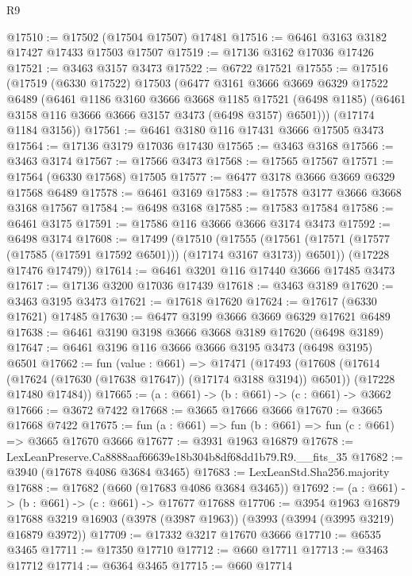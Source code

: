 \begin{lexlean}{R9}
\begin{coremodule}
@17510 := @17502 (@17504 @17507) @17481
@17516 := @6461 @3163 @3182 @17427 @17433 @17503 @17507
@17519 := @17136 @3162 @17036 @17426
@17521 := @3463 @3157 @3473
@17522 := @6722 @17521
@17555 := @17516
    (@17519
      (@6330 @17522)
      @17503
      (@6477
        @3161
        @3666
        @3669
        @6329
        @17522
        @6489
        (@6461
          @1186
          @3160
          @3666
          @3668
          @1185
          @17521
          (@6498 @1185)
          (@6461 @3158 @116 @3666 @3666 @3157 @3473 (@6498 @3157) @6501)))
      (@17174 @1184 @3156))
@17561 := @6461 @3180 @116 @17431 @3666 @17505 @3473
@17564 := @17136 @3179 @17036 @17430
@17565 := @3463 @3168
@17566 := @3463 @3174
@17567 := @17566 @3473
@17568 := @17565 @17567
@17571 := @17564 (@6330 @17568) @17505
@17577 := @6477 @3178 @3666 @3669 @6329 @17568 @6489
@17578 := @6461 @3169
@17583 := @17578 @3177 @3666 @3668 @3168 @17567
@17584 := @6498 @3168
@17585 := @17583 @17584
@17586 := @6461 @3175
@17591 := @17586 @116 @3666 @3666 @3174 @3473
@17592 := @6498 @3174
@17608 := @17499
    (@17510
      (@17555 (@17561 (@17571 (@17577 (@17585 (@17591 @17592 @6501))) (@17174 @3167 @3173)) @6501))
      (@17228 @17476 @17479))
@17614 := @6461 @3201 @116 @17440 @3666 @17485 @3473
@17617 := @17136 @3200 @17036 @17439
@17618 := @3463 @3189
@17620 := @3463 @3195 @3473
@17621 := @17618 @17620
@17624 := @17617 (@6330 @17621) @17485
@17630 := @6477 @3199 @3666 @3669 @6329 @17621 @6489
@17638 := @6461 @3190 @3198 @3666 @3668 @3189 @17620 (@6498 @3189)
@17647 := @6461 @3196 @116 @3666 @3666 @3195 @3473 (@6498 @3195) @6501
@17662 := fun (value : @661) =>
  @17471
    (@17493
      (@17608 (@17614 (@17624 (@17630 (@17638 @17647)) (@17174 @3188 @3194)) @6501))
      (@17228 @17480 @17484))
@17665 := (a : @661) -> (b : @661) -> (c : @661) -> @3662
@17666 := @3672 @7422
@17668 := @3665 @17666 @3666
@17670 := @3665 @17668 @7422
@17675 := fun (a : @661) => fun (b : @661) => fun (c : @661) => @3665 @17670 @3666
@17677 := @3931 @1963 @16879
@17678 := LexLeanPreserve.Ca8888aaf66639e18b304b8df68dd1b79.R9.__fits_35
@17682 := @3940 (@17678 @4086 @3684 @3465)
@17683 := LexLeanStd.Sha256.majority
@17688 := @17682 (@660 (@17683 @4086 @3684 @3465))
@17692 := (a : @661) -> (b : @661) -> (c : @661) -> @17677 @17688
@17706 := @3954
    @1963
    @16879
    @17688
    @3219
    @16903
    (@3978 (@3987 @1963))
    (@3993 (@3994 (@3995 @3219) @16879 @3972))
@17709 := @17332 @3217 @17670 @3666
@17710 := @6535 @3465
@17711 := @17350 @17710
@17712 := @660 @17711
@17713 := @3463 @17712
@17714 := @6364 @3465
@17715 := @660 @17714

\end{coremodule}
\end{lexlean}
